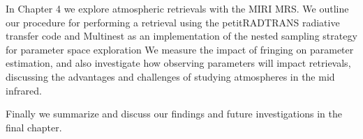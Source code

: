 In Chapter 4 we explore atmospheric retrievals with the MIRI MRS.
We outline our procedure for performing a retrieval using the petitRADTRANS radiative transfer code and Multinest as an implementation of the nested sampling strategy for parameter space exploration
We measure the impact of fringing on parameter estimation, and also investigate how observing parameters will impact retrievals, discussing the advantages and challenges of studying atmospheres in the mid infrared.

Finally we summarize and discuss our findings and future investigations in the final chapter.

